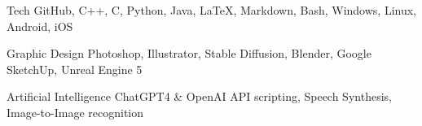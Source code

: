 


\begin{cvskills}


  \cvskill
    {Tech} %
    {GitHub, C++, C, Python, Java, LaTeX, Markdown, Bash, Windows, Linux, Android, iOS} %

  \cvskill
    {Graphic Design} %
    {Photoshop, Illustrator, Stable Diffusion, Blender, Google SketchUp, Unreal Engine 5} %

  \cvskill
    {Artificial Intelligence} %
	{ChatGPT4 \& OpenAI API scripting, Speech Synthesis, Image-to-Image recognition} %


\end{cvskills}
